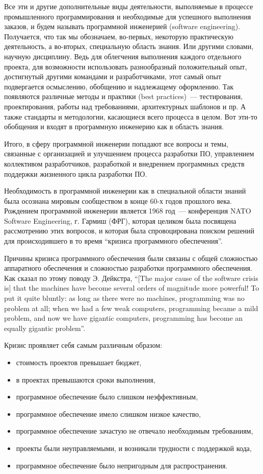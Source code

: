 \documentclass{../../text-style}
\begin{document}
Все эти и другие дополнительные виды деятельности, выполняемые в процессе промышленного программирования и необходимые для успешного выполнения заказов, и будем называть программной инженерией (software engineering). Получается, что так мы обозначаем, во-первых, некоторую практическую деятельность, а во-вторых, специальную область знания. Или другими словами, научную дисциплину. Ведь для облегчения выполнения каждого отдельного проекта, для возможности использовать разнообразный положительный опыт, достигнутый другими командами и разработчиками, этот самый опыт подвергается осмыслению, обобщению и надлежащему оформлению. Так появляются различные методы и практики (best practices)~--- тестирования, проектирования, работы над требованиями, архитектурных шаблонов и пр. А также стандарты и методологии, касающиеся всего процесса в целом. Вот эти-то обобщения и входят в программную инженерию как в область знания.

Итого, в сферу программной инженерии попадают все вопросы и темы, связанные с организацией и улучшением процесса разработки ПО, управлением коллективом разработчиков, разработкой и внедрением программных средств поддержки жизненного цикла разработки ПО. 

Необходимость в программной инженерии как в специальной области знаний была осознана мировым сообществом в конце 60-х годов прошлого века. Рождением программной инженерии является 1968 год~--- конференция NATO Software Engineering, г. Гармиш (ФРГ), которая целиком была посвящена рассмотрению этих вопросов, и которая была спровоцирована поиском решений для происходившего в то время \enquote{кризиса программного обеспечения}.

Причины кризиса программного обеспечения были связаны с общей сложностью аппаратного обеспечения и сложностью разработки программного обеспечения. Как сказал по этому поводу Э. Дейкстра, \enquote{[The major cause of the software crisis is] that the machines have become several orders of magnitude more powerful! To put it quite bluntly: as long as there were no machines, programming was no problem at all; when we had a few weak computers, programming became a mild problem, and now we have gigantic computers, programming has become an equally gigantic problem}.

Кризис проявляет себя самым различным образом:
\begin{itemize}
    \item стоимость проектов превышает бюджет,
    \item в проектах превышаются сроки выполнения,
    \item программное обеспечение было слишком неэффективным,
    \item программное обеспечение имело слишком низкое качество,
    \item программное обеспечение зачастую не отвечало необходимым требованиям,
    \item проекты были неуправляемыми, и возникали трудности с поддержкой кода,
    \item программное обеспечение было непригодным для распространения.
\end{itemize}
\end{document}
